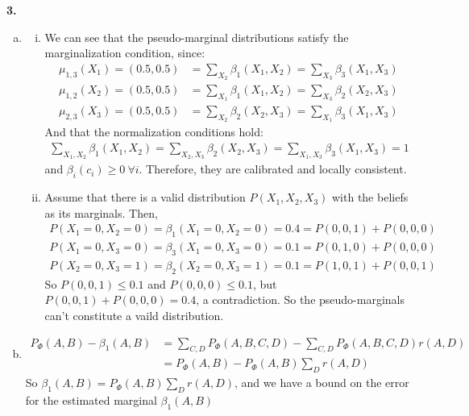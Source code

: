 \documentclass{article}
\begin{document}
\textbf{3.} \begin{enumerate}[(a)]
    \item \begin{enumerate}[(i)]
        \item We can see that the pseudo-marginal distributions satisfy the marginalization condition, since: \begin{align*}
            \mu_{1, 3}(X_1) = (0.5, 0.5) &= \sum_{X_2}\beta_1(X_1, X_2) = \sum_{X_3}\beta_3(X_1, X_3) \\[0.5ex]
            \mu_{1, 2}(X_2) = (0.5, 0.5) &= \sum_{X_1}\beta_1(X_1, X_2) = \sum_{X_3}\beta_2(X_2, X_3) \\[0.5ex]
            \mu_{2, 3}(X_3) = (0.5, 0.5) &= \sum_{X_2}\beta_2(X_2, X_3) = \sum_{X_1}\beta_3(X_1, X_3)
        \end{align*}
        And that the normalization conditions hold: \begin{align*}
            \sum_{X_1, X_2}\beta_1(X_1, X_2)  = \sum_{X_2, X_3}\beta_2(X_2, X_3) = \sum_{X_1, X_3}\beta_3(X_1, X_3) = 1
        \end{align*} and $\beta_i(c_i) \geq 0 \ \forall i $. Therefore, they are calibrated and locally consistent. 
        \item Assume that there is a valid distribution $P(X_1, X_2, X_3)$ with the beliefs as its marginals. Then, \begin{align*}
            P(X_1 = 0, X_2 = 0) = \beta_1(X_1 = 0, X_2 = 0) = 0.4 = P(0, 0, 1) + P(0, 0, 0) \\[0.5ex]
            P(X_1 = 0, X_3 = 0) = \beta_3(X_1 = 0, X_3 = 0) = 0.1 = P(0, 1, 0) + P(0, 0, 0) \\[0.5ex]
            P(X_2 = 0, X_3 = 1) = \beta_2(X_2 = 0, X_3 = 1) = 0.1 = P(1, 0, 1) + P(0, 0, 1)
        \end{align*}
        So $P(0, 0, 1) \leq 0.1$ and $P(0, 0, 0) \leq 0.1$, but $P(0, 0, 1) + P(0, 0, 0) = 0.4$, a contradiction. So the pseudo-marginals can't constitute a vaild distribution.
    \end{enumerate}
    \item \begin{align*}
        P_{\Phi}(A, B) - \beta_1(A, B) &= \sum_{C, D} P_{\Phi}(A, B, C, D) - \sum_{C, D} P_{\Phi}(A, B, C, D) r(A, D) \\
        &= P_{\Phi}(A, B) - P_{\Phi}(A, B) \sum_{D}r(A, D)
    \end{align*}
    So $\beta_1(A, B) =  P_{\Phi}(A, B) \sum_{D}r(A, D)$, and we have a bound on the error for the estimated marginal $\beta_1(A, B)$
\end{enumerate}
\end{document}
